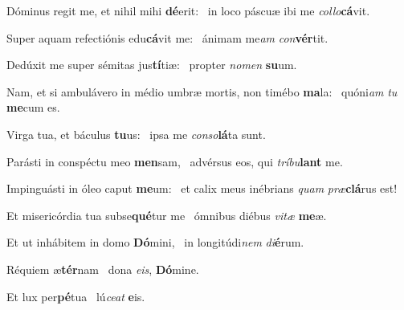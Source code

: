 \item Dóminus regit me, et nihil mihi \textbf{dé}erit:~\psstar{} in loco páscuæ ibi me \textit{collo}\textbf{cá}vit.
\item Super aquam refectiónis edu\textbf{cá}vit me:~\psstar{} ánimam me\textit{am} \textit{con}\textbf{vér}tit.
\item Dedúxit me super sémitas jus\textbf{tí}tiæ:~\psstar{} propter \textit{nomen} \textbf{su}um.
\item Nam, et si ambulávero in médio umbræ mortis, non timébo \textbf{ma}la:~\psstar{} quóni\textit{am} \textit{tu} \textbf{me}cum es.
\item Virga tua, et báculus \textbf{tu}us:~\psstar{} ipsa me \textit{conso}\textbf{lá}ta sunt.
\item Parásti in conspéctu meo \textbf{men}sam,~\psstar{} advérsus eos, qui \textit{tríbu}\textbf{lant} me.
\item Impinguásti in óleo caput \textbf{me}um:~\psstar{} et calix meus inébrians \textit{quam} \textit{præ}\textbf{clá}rus est!
\item Et misericórdia tua subse\textbf{qué}\-tur me~\psstar{} ómnibus diébus \textit{vitæ} \textbf{me}æ.
\item Et ut inhábitem in domo \textbf{Dó}mini,~\psstar{} in longitúdi\textit{nem} \textit{di}\textbf{é}rum.
\item Réquiem æ\textbf{tér}nam~\psstar{} dona \textit{eis}, \textbf{Dó}mine.
\item Et lux per\textbf{pé}tua~\psstar{} lú\textit{ceat} \textbf{e}is.